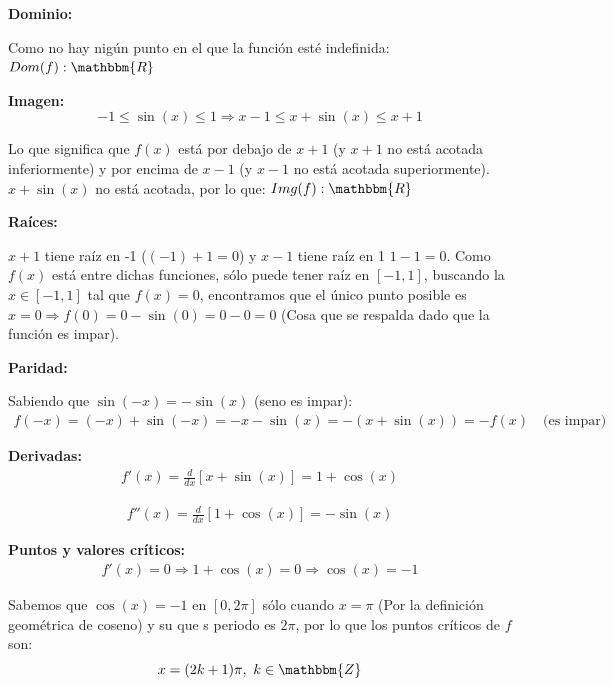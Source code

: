 \documentclass[12pt]{article}
\begin{document}
\begin{enumerate}[\hspace{9px} a)]
    \textbf{Dominio: }\medskip

        Como no hay nig\'un punto en el que la funci\'on est\'e indefinida: \(Dom(f): \mathbbm{R}\)\medskip

    \textbf{Imagen: }\medskip
        \begin{equation*}
            -1\leq\sin(x)\leq1 \Longrightarrow x-1\leq x+\sin(x)\leq x+1
        \end{equation*}

        Lo que significa que \(f(x)\) est\'a por debajo de \(x+1\) (y \(x+1\) no est\'a acotada inferiormente) y por encima de \(x-1\) (y \(x-1\) no est\'a acotada superiormente). \(x+\sin(x)\) no est\'a acotada, por lo que: \(Img(f): \mathbbm{R}\)\medskip

    \textbf{Ra\'ices: }\medskip

        \(x+1\) tiene ra\'iz en -1 (\((-1)+1=0\)) y \(x-1\) tiene ra\'iz en 1 \(1-1=0\). Como \(f(x)\) est\'a entre dichas funciones, s\'olo puede tener ra\'iz en \([-1,1]\), buscando la \(x\in[-1,1]\) tal que \(f(x)=0\), encontramos que el \'unico punto posible es \(x=0 \Rightarrow f(0)=0-\sin(0)=0-0=0\) (Cosa que se respalda dado que la funci\'on es impar).\medskip

    \textbf{Paridad: }\medskip

        Sabiendo que \(\sin(-x)=-\sin(x)\) (seno es impar):
        \begin{align*}
            f(-x)=(-x)+\sin(-x)=-x-\sin(x)=-(x+\sin(x))=-f(x) \quad \text{(es impar)}
        \end{align*}

    \textbf{Derivadas: }
        \begin{align*}
            f'(x) = \frac{d}{dx}[x+\sin(x)] = 1+\cos(x)
        \end{align*}

        \begin{align*}
            f''(x) = \frac{d}{dx}[1+\cos(x)]=-\sin(x)        
        \end{align*}

    \textbf{Puntos y valores cr\'iticos: }
        \begin{align*}
            f'(x)=0 \Longrightarrow 1+\cos(x)=0 \Longrightarrow \cos(x)=-1
        \end{align*}

        Sabemos que \(\cos(x)=-1\) en \([0,2\pi]\) s\'olo cuando \(x=\pi\) (Por la definici\'on geom\'etrica de coseno) y su que s periodo es \(2\pi\), por lo que los puntos cr\'iticos de $f$ son:
        \[x=(2k+1)\pi, \ k\in\mathbbm{Z}\]


\end{enumerate}
\end{document}
